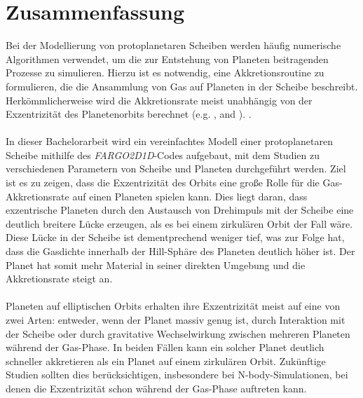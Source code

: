 
\section*{Zusammenfassung}
  Bei der Modellierung von protoplanetaren Scheiben werden häufig numerische 
  Algorithmen verwendet, um die zur Entstehung von Planeten beitragenden 
  Prozesse zu simulieren. Hierzu ist es notwendig, eine Akkretionsroutine
  zu formulieren, die die Ansammlung von Gas auf Planeten in der Scheibe 
  beschreibt. Herkömmlicherweise wird die Akkretionsrate meist unabhängig von 
  der Exzentrizität des Planetenorbits berechnet
  (e.g. \citeauthor{Ida_2018} \citeyear{Ida_2018}, \citeauthor{Benz_2014} 
  \citeyear{Benz_2014} and \citeauthor{Mordasini_2012} 
  \citeyear{Mordasini_2012}).
  . \\
  \\
  In dieser Bachelorarbeit wird ein vereinfachtes Modell einer protoplanetaren 
  Scheibe mithilfe des \textit{FARGO2D1D}-Codes aufgebaut, mit dem Studien zu 
  verschiedenen Parametern von Scheibe und Planeten durchgeführt werden. 
  Ziel ist es zu zeigen, 
  dass die Exzentrizität des Orbits eine große Rolle für die 
  Gas-Akkretionsrate auf einen Planeten spielen kann. Dies liegt daran, dass 
  exzentrische Planeten durch den Austausch von Drehimpuls mit der Scheibe 
  eine deutlich breitere Lücke erzeugen, als es bei einem zirkulären 
  Orbit der Fall wäre. Diese Lücke in der Scheibe ist dementprechend 
  weniger tief, was zur Folge hat, dass die Gasdichte innerhalb der Hill-Sphäre 
  des Planeten deutlich höher ist. Der Planet hat somit mehr Material in seiner
  direkten Umgebung und die Akkretionsrate steigt an. \\
  \\
  Planeten auf elliptischen Orbits erhalten ihre Exzentrizität meist 
  auf eine von zwei Arten: entweder, wenn der Planet massiv genug ist,
  durch Interaktion mit der Scheibe oder durch gravitative Wechselwirkung
  zwischen mehreren Planeten während der Gas-Phase. In beiden Fällen kann ein 
  solcher Planet deutlich schneller akkretieren als ein Planet auf einem 
  zirkulären Orbit. Zukünftige Studien sollten dies berücksichtigen,
  insbesondere bei N-body-Simulationen, bei denen die Exzentrizität schon 
  während der Gas-Phase auftreten kann.
